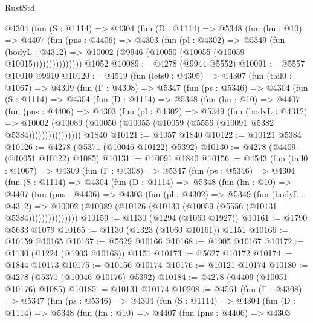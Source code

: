 \begin{lexlean}{RustStd}
\begin{coremodule}
            @4304
              (fun (S : @1114) =>
              @4304
                (fun (D : @1114) =>
                @5348
                  (fun (hn : @10) =>
                  @4407
                    (fun (pns : @4406) =>
                    @4303
                      (fun (pl : @4302) =>
                      @5349
                        (fun (bodyL : @4312) =>
                        @10002 (@9946 (@10050 (@10055 (@10059 @10015)))))))))))))))
    @1052
@10089 := @4278 (@9944 @5552)
@10091 := @5557 @10010 @9910
@10120 := @4519
    (fun (lets0 : @4305) =>
    @4307
      (fun (tail0 : @1067) =>
      @4309
        (fun (Γ : @4308) =>
        @5347
          (fun (ps : @5346) =>
          @4304
            (fun (S : @1114) =>
            @4304
              (fun (D : @1114) =>
              @5348
                (fun (hn : @10) =>
                @4407
                  (fun (pns : @4406) =>
                  @4303
                    (fun (pl : @4302) =>
                    @5349
                      (fun (bodyL : @4312) =>
                      @10002
                        (@10089 (@10050 (@10055 (@10059 (@5556 (@10091 @5382 @5384))))))))))))))))
    @1840
@10121 := @1057 @1840
@10122 := @10121 @5384
@10126 := @4278 (@5371 (@10046 @10122) @5392)
@10130 := @4278 (@4409 (@10051 @10122) @1085)
@10131 := @10091 @1840
@10156 := @4543
    (fun (tail0 : @1067) =>
    @4309
      (fun (Γ : @4308) =>
      @5347
        (fun (ps : @5346) =>
        @4304
          (fun (S : @1114) =>
          @4304
            (fun (D : @1114) =>
            @5348
              (fun (hn : @10) =>
              @4407
                (fun (pns : @4406) =>
                @4303
                  (fun (pl : @4302) =>
                  @5349
                    (fun (bodyL : @4312) =>
                    @10002 (@10089 (@10126 (@10130 (@10059 (@5556 (@10131 @5384)))))))))))))))
@10159 := @1130 (@1294 (@1060 @1927))
@10161 := @1790 @5633 @1079
@10165 := @1130 (@1323 (@1060 @10161)) @1151
@10166 := @10159 @10165
@10167 := @5629 @10166
@10168 := @1905 @10167
@10172 := @1130 (@1224 (@1903 @10168)) @1151
@10173 := @5627 @10172
@10174 := @1844 @10173
@10175 := @10156 @10174
@10176 := @10121 @10174
@10180 := @4278 (@5371 (@10046 @10176) @5392)
@10184 := @4278 (@4409 (@10051 @10176) @1085)
@10185 := @10131 @10174
@10208 := @4561
    (fun (Γ : @4308) =>
    @5347
      (fun (ps : @5346) =>
      @4304
        (fun (S : @1114) =>
        @4304
          (fun (D : @1114) =>
          @5348
            (fun (hn : @10) =>
            @4407
              (fun (pns : @4406) =>
              @4303

\end{coremodule}
\end{lexlean}
